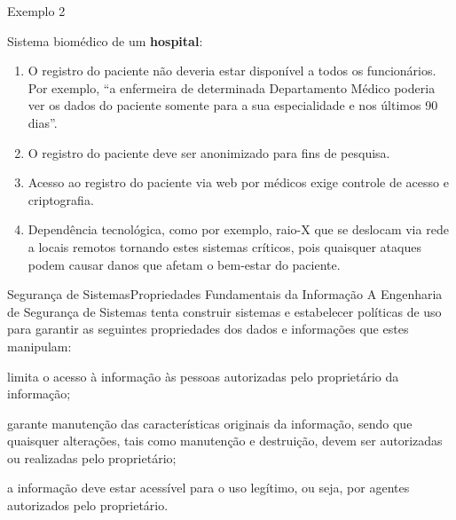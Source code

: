 \begin{frame}{Exemplo 2~\small\cite{ross2008}}\small

  Sistema biomédico de um {\bf hospital}:
  
  \begin{enumerate}[<+-| alert@+>]
  \item O registro do paciente não deveria estar disponível a todos os funcionários.
    Por exemplo, ``a enfermeira de determinada Departamento Médico poderia ver os dados
    do paciente somente para a sua especialidade e nos últimos 90 dias''.
  \item O registro do paciente deve ser anonimizado para fins de pesquisa.
  \item Acesso ao registro do paciente via web por médicos exige controle de acesso e
    criptografia.
  \item Dependência tecnológica, como por exemplo, raio-X que se deslocam via rede
    a locais remotos tornando estes sistemas críticos, pois quaisquer ataques podem
    causar danos que afetam o bem-estar do paciente.
  \end{enumerate}
  
\end{frame}


\begin{frame}{Segurança de Sistemas}{Propriedades Fundamentais da Informação}
  A Engenharia de Segurança de Sistemas tenta construir sistemas e
  estabelecer políticas de uso para garantir as seguintes propriedades
  dos dados e informações que estes manipulam:

  \begin{description}[<+-| alert@+>]
  \item[Confidencialidade:] limita o acesso à informação às pessoas
    autorizadas pelo proprietário da informação;
  \item[Integridade:] garante manutenção das características originais
    da informação, sendo que quaisquer alterações, tais como
    manutenção e destruição, devem ser autorizadas ou realizadas pelo
    proprietário;
  \item[Disponibilidade:] a informação deve estar acessível para o uso
    legítimo, ou seja, por agentes autorizados pelo proprietário.
  \end{description}
  
\end{frame}

